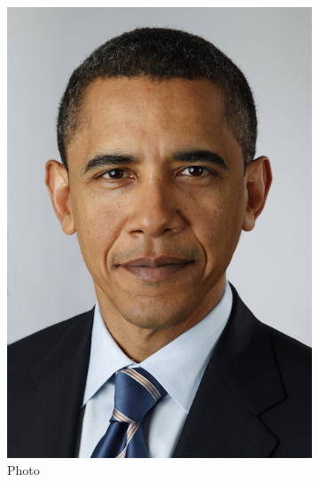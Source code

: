 \documentclass[11pt]{article}
\begin{document}
\begin{enumerate}
\begin{figure}[H]
    \centering
     \begin{subfigure}{0.4\textwidth}
        \centering
        \includegraphics[width=\textwidth]{../images/obama.png}
 \caption{Photo}
    \end{subfigure}
        \begin{subfigure}{0.4\textwidth}
        \centering

\end{subfigure}
\end{figure}
\end{enumerate}
\end{document}
